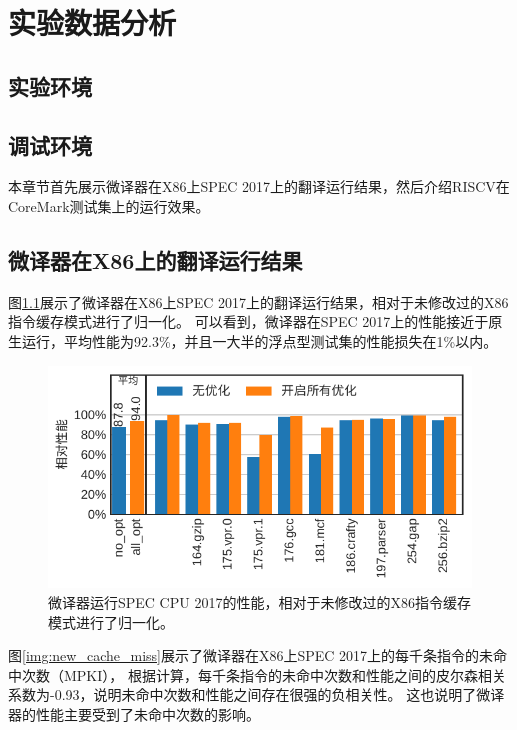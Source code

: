 \chapter{实验数据分析}\label{chap:Epxeriment}

\section{实验环境}


\section{调试环境}

本章节首先展示微译器在X86上SPEC 2017上的翻译运行结果，然后介绍RISCV在CoreMark测试集上的运行效果。

\section{微译器在X86上的翻译运行结果}

图\ref{img:ucache_ipc}展示了微译器在X86上SPEC 2017上的翻译运行结果，相对于未修改过的X86指令缓存模式进行了归一化。
可以看到，微译器在SPEC 2017上的性能接近于原生运行，平均性能为92.3\%，并且一大半的浮点型测试集的性能损失在1\%以内。

\begin{figure}[!htbp]
  \centering
  \includegraphics[width=1\linewidth]{./plot/ucache_ipc.pdf}
  \caption{微译器运行SPEC CPU 2017的性能，相对于未修改过的X86指令缓存模式进行了归一化。}
  \label{img:ucache_ipc}
\end{figure}

图\ref{img:new_cache_miss}展示了微译器在X86上SPEC 2017上的每千条指令的未命中次数（MPKI），
根据计算，每千条指令的未命中次数和性能之间的皮尔森相关系数为-0.93，说明未命中次数和性能之间存在很强的负相关性。
这也说明了微译器的性能主要受到了未命中次数的影响。

